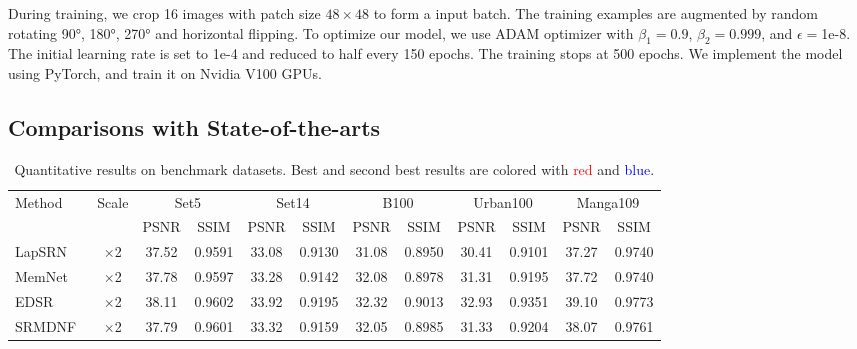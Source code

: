 \documentclass[10pt,twocolumn,letterpaper]{article}
\begin{document}
During training, we crop 16 images with patch size $48\times 48$ to form a input batch. The training examples are augmented by random rotating \ang{90}, \ang{180}, \ang{270} and horizontal flipping. To optimize our model, we use ADAM optimizer \cite{kingma2014adam} with $\beta_1=0.9$, $\beta_2=0.999$, and $\epsilon=$1e-8. The initial learning rate is set to 1e-4 and reduced to half every 150 epochs. The training stops at 500 epochs. We implement the model using PyTorch, and train it on Nvidia V100 GPUs. 

\subsection{Comparisons with State-of-the-arts}
\begin{table*}[thbp]\setlength{\tabcolsep}{7pt}
\small
\center
\begin{center}
\caption{Quantitative results on benchmark datasets. Best and second best results are colored with \textcolor{red}{red} and \textcolor{blue}{blue}.}
\label{tab:results_psnr_ssim_x2348}
\begin{tabular}{|l|c|c|c|c|c|c|c|c|c|c|c|}
\hline
\multirow{2}{*}{Method} & \multirow{2}{*}{Scale} &  \multicolumn{2}{c|}{Set5} &  \multicolumn{2}{c|}{Set14} &  \multicolumn{2}{c|}{B100} &  \multicolumn{2}{c|}{Urban100} &  \multicolumn{2}{c|}{Manga109}  
\\
\cline{3-12}
&  & PSNR & SSIM & PSNR & SSIM & PSNR & SSIM & PSNR & SSIM & PSNR & SSIM 
\\
\hline
\hline


LapSRN~\cite{lai2017deep} & $\times$2 
& 37.52
 & 0.9591
  & 33.08
   & 0.9130
    & 31.08
     & 0.8950
      & 30.41
       & 0.9101
        & 37.27
         & 0.9740
                   
\\
MemNet~\cite{tai2017memnet} & $\times$2 
& 37.78
 & 0.9597
  & 33.28
   & 0.9142
    & 32.08
     & 0.8978
      & 31.31
       & 0.9195
        & 37.72
         & 0.9740
                   
\\
EDSR~\cite{lim2017enhanced} & $\times$2 
& 38.11
 & 0.9602
  & 33.92
   & 0.9195
    & 32.32
     & 0.9013
      & 32.93
       & 0.9351
        & 39.10
         & 0.9773
                   
\\
SRMDNF~\cite{zhang2018learning} & $\times$2 
& 37.79
 & 0.9601
  & 33.32
   & 0.9159
    & 32.05
     & 0.8985
      & 31.33
       & 0.9204
        & 38.07
         & 0.9761
                   

\end{tabular}
\end{center}
\end{table*}
\end{document}
